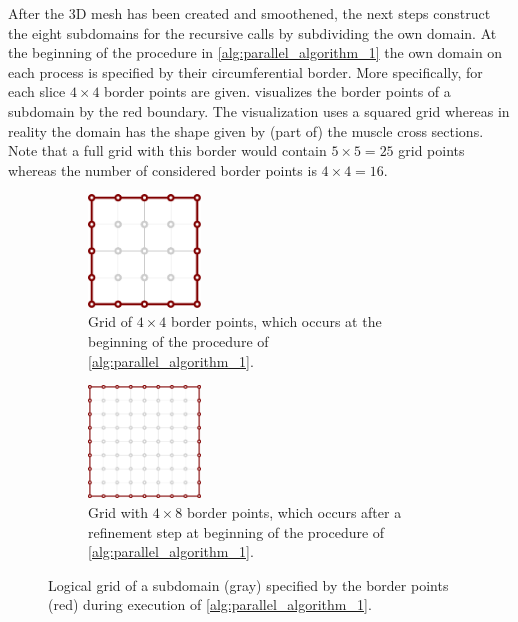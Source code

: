 After the 3D mesh has been created and smoothened, the next steps construct the eight subdomains for the recursive calls by subdividing the own domain.
At the beginning of the procedure in \cref{alg:parallel_algorithm_1} the own domain on each process is specified by their circumferential border. More specifically, for each slice $4 \times 4$ border points are given.  visualizes the border points of a subdomain by the red boundary. The visualization uses a squared grid whereas in reality the domain has the shape given by (part of) the muscle cross sections. Note that a full grid with this border would contain $5 \times 5 =25 $ grid points whereas the number of considered border points is $4 \times 4 = 16$.

\begin{figure}%
  \centering%
  \begin{subfigure}[t]{0.48\textwidth}%
    \centering%
    \includegraphics[width=3cm]{images/parallel_fiber_estimation/border_grid.pdf}%
   \caption{Grid of $4 \times 4$ border points, which occurs at the beginning of the procedure of \cref{alg:parallel_algorithm_1}.}%
    \label{fig:border_grid_1}%
  \end{subfigure}
  \quad
  \begin{subfigure}[t]{0.48\textwidth}%
    \centering%
    \includegraphics[width=3cm]{images/parallel_fiber_estimation/border_grid_2.pdf}%
    \caption{Grid with $4 \times 8$ border points, which occurs after a refinement step at beginning of the procedure of \cref{alg:parallel_algorithm_1}.}%
    \label{fig:border_grid_2}%
  \end{subfigure}   
  \caption{Logical grid of a subdomain (gray) specified by the border points (red) during execution of \cref{alg:parallel_algorithm_1}.}%
  \label{fig:border_grid}%
\end{figure}%

